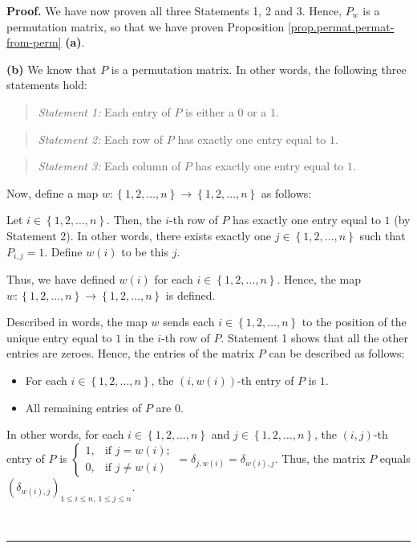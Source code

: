 \documentclass[numbers=enddot,12pt,final,onecolumn,notitlepage]{scrartcl}%
\theoremstyle{definition}
\newenvironment{statement}{\begin{quote}}{\end{quote}}
\newenvironment{proof}[1][Proof]{\noindent\textbf{#1.} }{\ \rule{0.5em}{0.5em}}
\begin{document}
\begin{proof}
We have now proven all three Statements 1, 2 and 3. Hence, $P_{w}$ is a
permutation matrix, so that we have proven Proposition
\ref{prop.permat.permat-from-perm} \textbf{(a)}.

\textbf{(b)} We know that $P$ is a permutation matrix. In other words, the
following three statements hold:

\begin{statement}
\textit{Statement 1:} Each entry of $P$ is either a $0$ or a $1$.
\end{statement}

\begin{statement}
\textit{Statement 2:} Each row of $P$ has exactly one entry equal to $1$.
\end{statement}

\begin{statement}
\textit{Statement 3:} Each column of $P$ has exactly one entry equal to $1$.
\end{statement}

Now, define a map $w:\left\{  1,2,\ldots,n\right\}  \rightarrow\left\{
1,2,\ldots,n\right\}  $ as follows:

Let $i\in\left\{  1,2,\ldots,n\right\}  $. Then, the $i$-th row of $P$ has
exactly one entry equal to $1$ (by Statement 2). In other words, there exists
exactly one $j\in\left\{  1,2,\ldots,n\right\}  $ such that $P_{i,j}=1$.
Define $w\left(  i\right)  $ to be this $j$.

Thus, we have defined $w\left(  i\right)  $ for each $i\in\left\{
1,2,\ldots,n\right\}  $. Hence, the map $w:\left\{  1,2,\ldots,n\right\}
\rightarrow\left\{  1,2,\ldots,n\right\}  $ is defined.

Described in words, the map $w$ sends each $i\in\left\{  1,2,\ldots,n\right\}
$ to the position of the unique entry equal to $1$ in the $i$-th row of $P$.
Statement 1 shows that all the other entries are zeroes. Hence, the entries of
the matrix $P$ can be described as follows:

\begin{itemize}
\item For each $i\in\left\{  1,2,\ldots,n\right\}  $, the $\left(  i,w\left(
i\right)  \right)  $-th entry of $P$ is $1$.

\item All remaining entries of $P$ are $0$.
\end{itemize}

In other words, for each $i\in\left\{  1,2,\ldots,n\right\}  $ and
$j\in\left\{  1,2,\ldots,n\right\}  $, the $\left(  i,j\right)  $-th entry of
$P$ is $%
\begin{cases}
1, & \text{if }j=w\left(  i\right)  ;\\
0, & \text{if }j\neq w\left(  i\right)
\end{cases}
=\delta_{j,w\left(  i\right)  }=\delta_{w\left(  i\right)  ,j}$. Thus, the
matrix $P$ equals $\left(  \delta_{w\left(  i\right)  ,j}\right)  _{1\leq
i\leq n,\ 1\leq j\leq n}$.


\end{proof}
\end{document}
